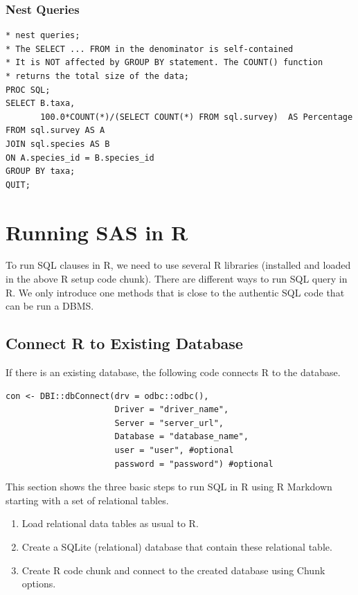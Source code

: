 \documentclass[
]{book}
\begin{document}
\hypertarget{nest-queries}{%
\subsubsection{Nest Queries}\label{nest-queries}}

\begin{verbatim}
* nest queries;
* The SELECT ... FROM in the denominator is self-contained
* It is NOT affected by GROUP BY statement. The COUNT() function
* returns the total size of the data;
PROC SQL;
SELECT B.taxa, 
       100.0*COUNT(*)/(SELECT COUNT(*) FROM sql.survey)  AS Percentage
FROM sql.survey AS A
JOIN sql.species AS B
ON A.species_id = B.species_id 
GROUP BY taxa;
QUIT;
\end{verbatim}

\hypertarget{running-sas-in-r}{%
\section{Running SAS in R}\label{running-sas-in-r}}

To run SQL clauses in R, we need to use several R libraries (installed and loaded in the above R setup code chunk). There are different ways to run SQL query in R. We only introduce one methods that is close to the authentic SQL code that can be run a DBMS.

\hypertarget{connect-r-to-existing-database}{%
\subsection{Connect R to Existing Database}\label{connect-r-to-existing-database}}

If there is an existing database, the following code connects R to the database.

\begin{verbatim}
con <- DBI::dbConnect(drv = odbc::odbc(),
                      Driver = "driver_name",
                      Server = "server_url",
                      Database = "database_name",
                      user = "user", #optional
                      password = "password") #optional
\end{verbatim}

This section shows the three basic steps to run SQL in R using R Markdown starting with a set of relational tables.

\begin{enumerate}
\def\labelenumi{\arabic{enumi}.}
\item
  Load relational data tables as usual to R.
\item
  Create a SQLite (relational) database that contain these relational table.
\item
  Create R code chunk and connect to the created database using Chunk options.
\end{enumerate}
\end{document}
